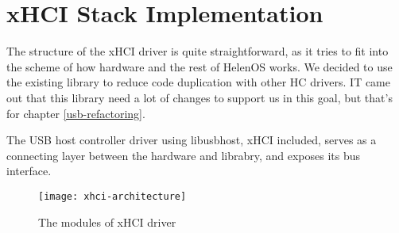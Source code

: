 \chapter{xHCI Stack Implementation}

The structure of the xHCI driver is quite straightforward, as it tries to fit
into the scheme of how hardware and the rest of HelenOS works. We decided to
use the existing library  to reduce code duplication with
other HC drivers. IT came out that this library need a lot of changes to
support us in this goal, but that's for chapter \ref{usb-refactoring}.

The USB host controller driver using libusbhost, xHCI included, serves as
a connecting layer between the hardware and librabry, and exposes its bus
interface.

\begin{figure}[h]
	\centering
	\texttt{[image: xhci-architecture]}
	\caption{The modules of xHCI driver}
\end{figure}
